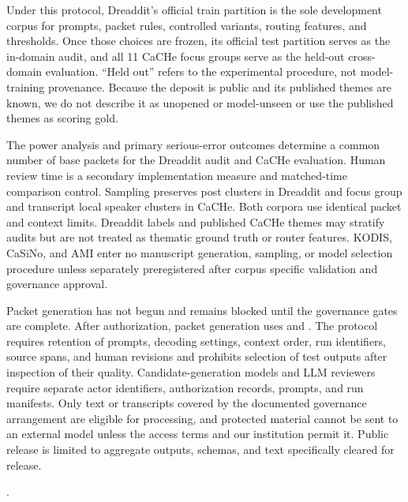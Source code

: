 Under this protocol, Dreaddit's official train partition is the sole development corpus for prompts, packet rules, controlled variants, routing features, and thresholds. Once those choices are frozen, its official test partition serves as the in-domain audit, and all 11 CaCHe focus groups serve as the held-out cross-domain evaluation. ``Held out'' refers to the experimental procedure, not model-training provenance. Because the deposit is public and its published themes are known, we do not describe it as unopened or model-unseen or use the published themes as scoring gold.

The power analysis and primary serious-error outcomes determine a common number of base
packets for the Dreaddit audit and CaCHe evaluation. Human review time is a
secondary implementation measure and matched-time comparison control. Sampling preserves post
clusters in Dreaddit and focus group and transcript local speaker clusters in
CaCHe. Both corpora use identical packet and context limits. Dreaddit labels
and published CaCHe themes may stratify audits but are not treated as thematic
ground truth or router features. KODIS, CaSiNo, and AMI enter no manuscript
generation, sampling,
or model selection procedure unless separately preregistered after corpus
specific validation and governance approval.

Packet generation has not begun and remains blocked until the governance gates are complete. After authorization, packet generation uses  and . The protocol requires retention of prompts, decoding settings, context order, run identifiers, source spans, and human revisions and prohibits selection of test outputs after inspection of their quality. Candidate-generation models and LLM reviewers require separate actor identifiers, authorization records, prompts, and run manifests. Only text or transcripts covered by the documented governance arrangement are eligible for processing, and protected material cannot be sent to an external model unless the access terms and our institution permit it. Public release is limited to aggregate outputs, schemas, and text specifically cleared for release.

.

